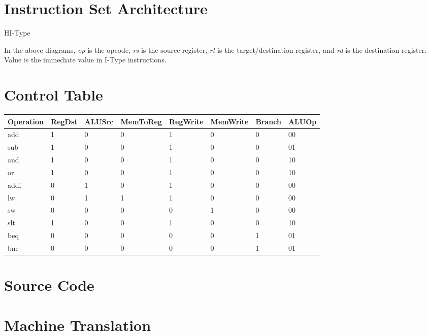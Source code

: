 \documentclass{article}
\newenvironment{problem}[1]{
  \nobreak\section*{#1}
}{}
\begin{document}
\begin{problem}{Instruction Set Architecture}
    \begin{register}{H}{I-Type}{}
      \begin{center}
      \end{center}
    \end{register}

    In the above diagrams, \emph{op} is the opcode, \emph{rs} is the
    source register, \emph{rt} is the target/destination register, and
    \emph{rd} is the destination register.  Value is the immediate value
    in I-Type instructions.
  \end{problem}

  \begin{problem}{Control Table}
    \begin{table}[]
      \begin{tabular}{@{}llllllll@{}}
      Operation & RegDst & ALUSrc & MemToReg & RegWrite & MemWrite & Branch & ALUOp \\ \midrule
      add & 1 & 0 & 0 & 1 & 0 & 0 & 00 \\
      sub & 1 & 0 & 0 & 1 & 0 & 0 & 01 \\
      and & 1 & 0 & 0 & 1 & 0 & 0 & 10 \\
      or & 1 & 0 & 0 & 1 & 0 & 0 & 10 \\
      addi & 0 & 1 & 0 & 1 & 0 & 0 & 00 \\
      lw & 0 & 1 & 1 & 1 & 0 & 0 & 00 \\
      sw & 0 & 0 & 0 & 0 & 1 & 0 & 00 \\
      slt & 1 & 0 & 0 & 1 & 0 & 0 & 10 \\
      beq & 0 & 0 & 0 & 0 & 0 & 1 & 01 \\
      bne & 0 & 0 & 0 & 0 & 0 & 1 & 01
      \end{tabular}
    \end{table}
  \end{problem}

  \begin{problem}{Source Code}
    
  \end{problem}

  \begin{problem}{Machine Translation}
    
  \end{problem}
\end{document}
